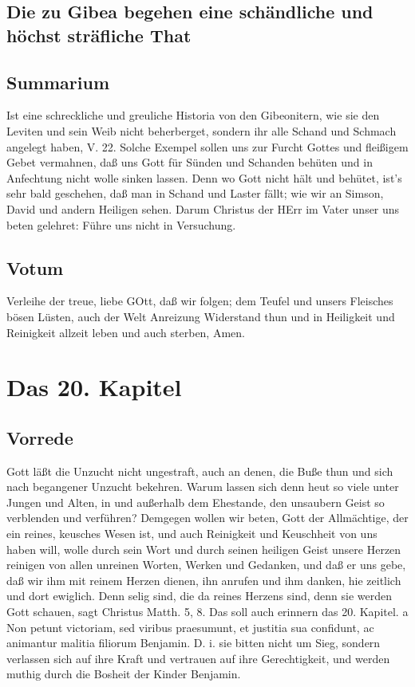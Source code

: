 \section[Die zu Gibea begehen eine schändliche und höchst]{Die zu Gibea begehen eine schändliche und höchst sträfliche That}
\section{Summarium}

Ist eine schreckliche und greuliche Historia von den Gibeonitern, wie sie den Leviten und sein Weib nicht beherberget, sondern ihr alle Schand und Schmach angelegt haben, V. 22. Solche Exempel sollen uns zur Furcht Gottes und fleißigem Gebet vermahnen, daß uns Gott für Sünden und Schanden behüten und in Anfechtung nicht wolle sinken lassen. Denn wo Gott nicht hält und behütet, ist's sehr bald geschehen, daß man in Schand und Laster fällt; wie wir an Simson, David und andern Heiligen sehen. Darum Christus der HErr im Vater unser uns beten gelehret: Führe uns nicht in Versuchung.

\section{Votum}

Verleihe der treue, liebe GOtt, daß wir folgen; dem Teufel und unsers Fleisches bösen Lüsten, auch der Welt Anreizung Widerstand thun und in Heiligkeit und Reinigkeit allzeit leben und auch sterben, Amen.

\chapter{Das 20. Kapitel}

\section{Vorrede}

Gott läßt die Unzucht nicht ungestraft, auch an denen, die Buße thun und sich nach begangener Unzucht bekehren. Warum lassen sich denn heut so viele unter Jungen und Alten, in und außerhalb dem Ehestande, den unsaubern Geist so verblenden und verführen? Demgegen wollen wir beten, Gott der Allmächtige, der ein reines, keusches Wesen ist, und auch Reinigkeit und Keuschheit von uns haben will, wolle durch sein Wort und durch seinen heiligen Geist unsere Herzen reinigen von allen unreinen Worten, Werken und Gedanken, und daß er uns gebe, daß wir ihm mit reinem Herzen dienen, ihn anrufen und ihm danken, hie zeitlich und dort ewiglich. Denn selig sind, die da reines Herzens sind, denn sie werden Gott schauen, sagt Christus Matth. 5, 8. Das soll auch erinnern das 20. Kapitel.
a Non petunt victoriam, sed viribus praesumunt, et justitia sua confidunt, ac animantur malitia filiorum Benjamin. D. i. sie bitten nicht um Sieg, sondern verlassen sich auf ihre Kraft und vertrauen auf ihre Gerechtigkeit, und werden muthig durch die Bosheit der Kinder Benjamin.

